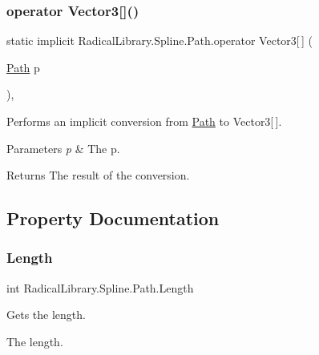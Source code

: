 \subsubsection{\texorpdfstring{operator Vector3[]()}{operator Vector3[]()}}
{\footnotesize\ttfamily static implicit Radical\+Library.\+Spline.\+Path.\+operator Vector3\mbox{[}$\,$\mbox{]} (\begin{DoxyParamCaption}\item[{\hyperlink{class_radical_library_1_1_spline_1_1_path}{Path}}]{p }\end{DoxyParamCaption})\hspace{0.3cm}{\ttfamily [inline]}, {\ttfamily [static]}}



Performs an implicit conversion from \hyperlink{class_radical_library_1_1_spline_1_1_path}{Path} to Vector3\mbox{[}$\,$\mbox{]}. 


\begin{DoxyParams}{Parameters}
{\em p} & The p.\\
\hline
\end{DoxyParams}
\begin{DoxyReturn}{Returns}
The result of the conversion.
\end{DoxyReturn}


\subsection{Property Documentation}
\mbox{\label{class_radical_library_1_1_spline_1_1_path_aedc28e4d2345dea1512425cc2438e82d}} 
\subsubsection{\texorpdfstring{Length}{Length}}
{\footnotesize\ttfamily int Radical\+Library.\+Spline.\+Path.\+Length\hspace{0.3cm}{\ttfamily [get]}}



Gets the length. 

The length.\mbox{\label{class_radical_library_1_1_spline_1_1_path_a30b8ec768fb58165f56d040384cc1e0e}} 
